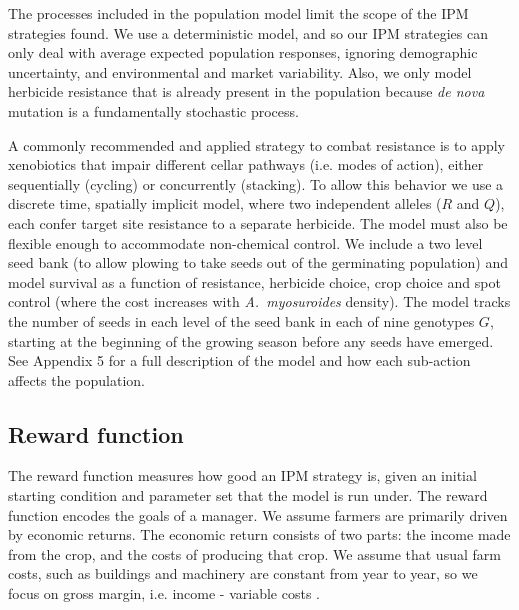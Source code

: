 \documentclass[9pt,twocolumn,twoside,lineno]{pnas-new}
\begin{document}
{The processes included in the population model limit the scope of the IPM strategies found. We use a deterministic model, and so our IPM strategies can only deal with average expected population responses, ignoring demographic uncertainty, and environmental and market variability. Also, we only model herbicide resistance that is already present in the population because \textit{de nova} mutation is a fundamentally stochastic process. 

A commonly recommended \citep{REX2013} and applied \citep{Hick2018} strategy to combat resistance is to apply xenobiotics that impair different cellar pathways (i.e. modes of action), either sequentially (cycling) or concurrently (stacking). To allow this behavior we use a discrete time, spatially implicit model, where two independent alleles ($R$ and $Q$), each confer target site resistance to a separate herbicide. The model must also be flexible enough to accommodate non-chemical control. We include a two level seed bank (to allow plowing to take seeds out of the germinating population) and model survival as a function of resistance, herbicide choice, crop choice and spot control (where the cost increases with \textit{A.\ myosuroides} density). The model tracks the number of seeds in each level of the seed bank in each of nine genotypes $G$, starting at the beginning of the growing season before any seeds have emerged. See Appendix 5 for a full description of the model and how each sub-action affects the population. 

\subsection*{Reward function}
The reward function measures how good an IPM strategy is, given an initial starting condition and parameter set that the model is run under. The reward function encodes the goals of a manager. We assume farmers are primarily driven by economic returns. The economic return consists of two parts: the income made from the crop, and the costs of producing that crop. We assume that usual farm costs, such as buildings and machinery are constant from year to year, so we focus on gross margin, i.e. income - variable costs \citep[pp.~3--4]{Nix2016}. 

}
\end{document}
